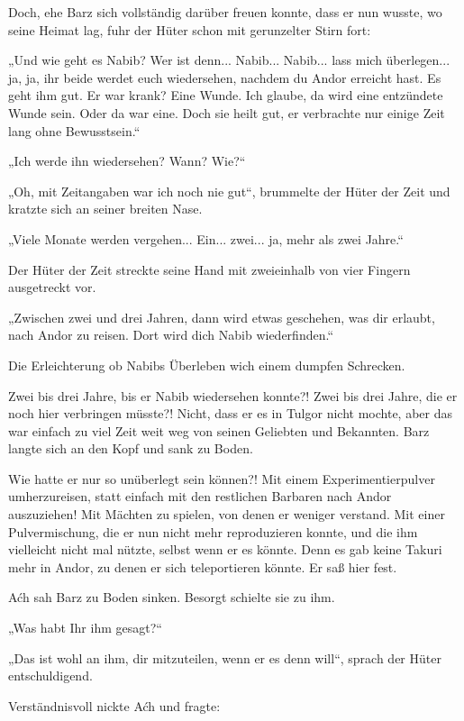 Doch, ehe Barz sich vollständig darüber freuen konnte, dass er nun wusste, wo seine Heimat lag, fuhr der Hüter schon mit gerunzelter Stirn fort:

„Und wie geht es Nabib? Wer ist denn... Nabib... Nabib... lass mich überlegen... ja, ja, ihr beide werdet euch wiedersehen, nachdem du Andor erreicht hast. Es geht ihm gut. Er war krank? Eine Wunde. Ich glaube, da wird eine entzündete Wunde sein. Oder da war eine. Doch sie heilt gut, er verbrachte nur einige Zeit lang ohne Bewusstsein.“

„Ich werde ihn wiedersehen? Wann? Wie?“

„Oh, mit Zeitangaben war ich noch nie gut“, brummelte der Hüter der Zeit und kratzte sich an seiner breiten Nase.

„Viele Monate werden vergehen... Ein... zwei... ja, mehr als zwei Jahre.“

Der Hüter der Zeit streckte seine Hand mit zweieinhalb von vier Fingern ausgetreckt vor.

„Zwischen zwei und drei Jahren, dann wird etwas geschehen, was dir erlaubt, nach Andor zu reisen. Dort wird dich Nabib wiederfinden.“

Die Erleichterung ob Nabibs Überleben wich einem dumpfen Schrecken.

Zwei bis drei Jahre, bis er Nabib wiedersehen konnte?! Zwei bis drei Jahre, die er noch hier verbringen müsste?! Nicht, dass er es in Tulgor nicht mochte, aber das war einfach zu viel Zeit weit weg von seinen Geliebten und Bekannten. Barz langte sich an den Kopf und sank zu Boden.

Wie hatte er nur so unüberlegt sein können?! Mit einem Experimentierpulver umherzureisen, statt einfach mit den restlichen Barbaren nach Andor auszuziehen! Mit Mächten zu spielen, von denen er weniger verstand. Mit einer Pulvermischung, die er nun nicht mehr reproduzieren konnte, und die ihm vielleicht nicht mal nützte, selbst wenn er es könnte. Denn es gab keine Takuri mehr in Andor, zu denen er sich teleportieren könnte. Er saß hier fest.



\trennzeichen



Aćh sah Barz zu Boden sinken. Besorgt schielte sie zu ihm.

„Was habt Ihr ihm gesagt?“

„Das ist wohl an ihm, dir mitzuteilen, wenn er es denn will“, sprach der Hüter entschuldigend.

Verständnisvoll nickte Aćh und fragte:

